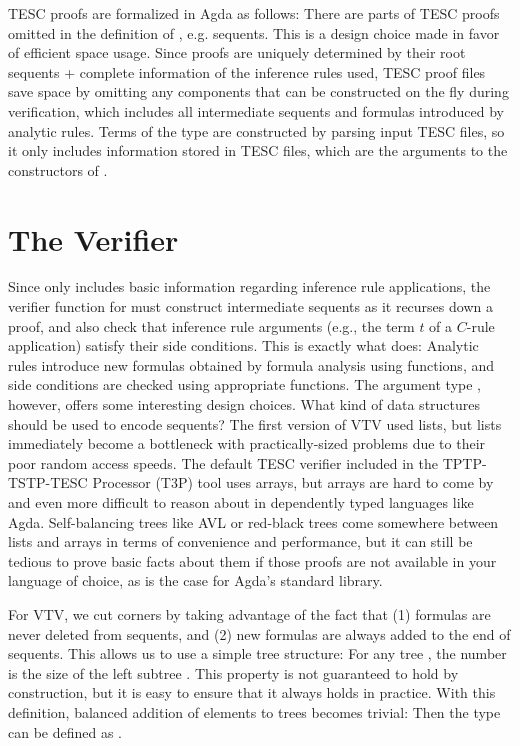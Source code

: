 \documentclass[12pt]{article}
\begin{document}
TESC proofs are formalized in Agda as follows:
There are parts of TESC proofs omitted in the definition of 
, e.g. sequents. This is a design choice made in favor of
efficient space usage. Since proofs are uniquely determined by their
root sequents + complete information of the inference rules used,
TESC proof files save space by omitting any components that can be 
constructed on the fly during verification, which includes all intermediate 
sequents and formulas introduced by analytic rules. Terms of the type 
 are constructed by parsing input TESC files, 
so it only includes information stored in TESC files, which are the arguments 
to the constructors of .



\section{The Verifier} \label{sec:verifier} 

Since  only includes basic information regarding inference 
rule applications, the verifier function for  must construct 
intermediate sequents as it recurses down a proof, and also check that inference 
rule arguments (e.g., the term $t$ of a $C$-rule application) satisfy their side 
conditions. This is exactly what  does:
Analytic rules introduce new formulas obtained by formula analysis using 
 functions, and side conditions are checked using appropriate 
 functions. The argument type , however, 
offers some interesting design choices. What kind of data structures should be used 
to encode sequents? The first version of VTV used lists, but lists immediately become 
a bottleneck with practically-sized problems due to their poor random access speeds. 
The default TESC verifier included in the TPTP-TSTP-TESC Processor (T3P) tool uses arrays, 
but arrays are hard to come by and even more difficult to reason about in dependently 
typed languages like Agda. Self-balancing trees like AVL or red-black trees come 
somewhere between lists and arrays in terms of convenience and performance, but it 
can still be tedious to prove basic facts about them if those proofs are not 
available in your language of choice, as is the case for Agda's standard library.

For VTV, we cut corners by taking advantage of the fact that (1) formulas 
are never deleted from sequents, and (2) new formulas are always added to the 
end of sequents. This allows us to use a simple tree structure:
For any tree     ,
the number  is the size of the left subtree . 
This property is not guaranteed to hold by construction,
but it is easy to ensure that it always holds in practice. With this definition,
balanced addition of elements to trees becomes trivial:
Then the type  can be defined as .
\end{document}
